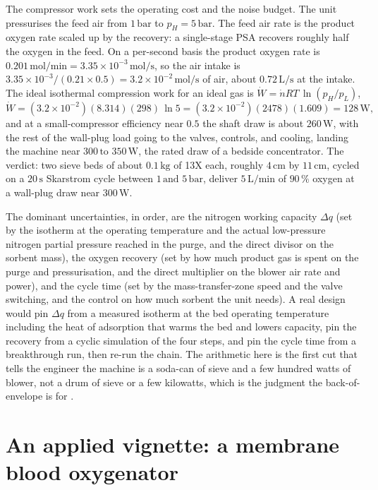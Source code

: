 The compressor work sets the operating cost and the noise budget. The unit
pressurises the feed air from $1\,\text{bar}$ to $p_H = 5\,\text{bar}$. The
feed air rate is the product oxygen rate scaled up by the recovery: a
single-stage PSA recovers roughly half the oxygen in the feed. On a
per-second basis the product oxygen rate is $0.201\,\text{mol/min} =
3.35\times 10^{-3}\,\text{mol/s}$, so the air intake is
$3.35\times 10^{-3}/(0.21\times 0.5) = 3.2\times 10^{-2}\,\text{mol/s}$
of air, about $0.72\,\text{L/s}$ at the intake. The ideal
isothermal compression work for an ideal gas is $\dot W = \dot n RT\,
\ln(p_H/p_L)$,
\[
\dot W = (3.2\times 10^{-2})(8.314)(298)\,\ln 5 = (3.2\times 10^{-2})
(2478)(1.609) = 128\,\text{W},
\]
and at a small-compressor efficiency near $0.5$ the shaft draw is about
$260\,\text{W}$, with the rest of the wall-plug load going to the valves,
controls, and cooling, landing the machine near $300\,\text{to }350\,
\text{W}$, the rated draw of a bedside concentrator. The verdict: two
sieve beds of about $0.1\,\text{kg}$ of 13X each, roughly $4\,\text{cm}$ by
$11\,\text{cm}$, cycled on a $20\,\text{s}$ Skarstrom cycle between
$1\,\text{and }5\,\text{bar}$, deliver $5\,\text{L/min}$ of $90\,\%$ oxygen
at a wall-plug draw near $300\,\text{W}$.

The dominant uncertainties, in order, are the nitrogen working capacity
$\Delta q$ (set by the isotherm at the operating temperature and the actual
low-pressure nitrogen partial pressure reached in the purge, and the direct
divisor on the sorbent mass), the oxygen recovery (set by how much product
gas is spent on the purge and pressurisation, and the direct multiplier on
the blower air rate and power), and the cycle time (set by the
mass-transfer-zone speed and the valve switching, and the control on how
much sorbent the unit needs). A real design would pin $\Delta q$ from a
measured isotherm at the bed operating temperature including the heat of
adsorption that warms the bed and lowers capacity, pin the recovery from a
cyclic simulation of the four steps, and pin the cycle time from a
breakthrough run, then re-run the chain. The arithmetic here is the first
cut that tells the engineer the machine is a soda-can of sieve and a few
hundred watts of blower, not a drum of sieve or a few kilowatts, which is
the judgment the back-of-envelope is for
\cite{text:treybal-mass-transfer,text:perry-chemical-engineers}.

\section{An applied vignette: a membrane blood oxygenator}


